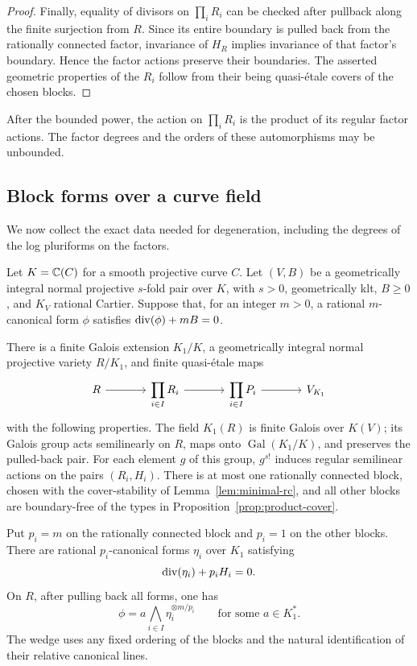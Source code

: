 \begin{proof}
Finally, equality of divisors on $\prod_iR_i$ can be checked after
pullback along the finite surjection from $R$.  Since its entire
boundary is pulled back from the rationally connected factor,
invariance of $H_R$ implies invariance of that factor's boundary.
Hence the factor actions preserve their boundaries.  The asserted
geometric properties of the $R_i$ follow
from their being quasi-\'etale covers of the chosen blocks.
\end{proof}

After the bounded power, the action on $\prod_iR_i$ is the product
of its regular factor actions.  The factor degrees and the orders
of these automorphisms may be unbounded.

\subsection{Block forms over a curve field}

We now collect the exact data needed for degeneration, including
the degrees of the log pluriforms on the factors.

\begin{corollary}\label{cor:block-forms}
Let $K=\mathbb C(C)$ for a smooth projective curve $C$.  Let $(V,B)$
be a geometrically integral normal projective $s$-fold pair over
$K$, with $s>0$, geometrically klt, $B\geq0$, and $K_V$
rational Cartier.  Suppose that, for an integer $m>0$, a rational $m$-canonical form
$\phi$ satisfies $\operatorname{div}(\phi)+mB=0$.

There is a finite Galois extension $K_1/K$, a geometrically integral
normal projective variety $R/K_1$, and finite quasi-\'etale maps
\[
\begin{tikzcd}[column sep=large]
 R \arrow[r] & \displaystyle\prod_{i\in I}R_i
 \arrow[r] & \displaystyle\prod_{i\in I}P_i
 \arrow[r] & V_{K_1}
\end{tikzcd}
\]
with the following properties.  The field $K_1(R)$ is finite Galois
over $K(V)$; its Galois group acts semilinearly on $R$, maps onto
$\operatorname{Gal}(K_1/K)$, and preserves the pulled-back pair.
For each element $g$ of this group, $g^{s!}$ induces regular
semilinear actions on the pairs $(R_i,H_i)$.  There is at most one
rationally connected block, chosen with the cover-stability of
Lemma~\ref{lem:minimal-rc}, and all other blocks are boundary-free
of the types in Proposition~\ref{prop:product-cover}.

Put $p_i=m$ on the rationally connected block and $p_i=1$ on the
other blocks.  There are rational $p_i$-canonical forms $\eta_i$
over $K_1$ satisfying
\begin{equation}\label{eq:block-trivializations}
                       \operatorname{div}(\eta_i)+p_iH_i=0.
\end{equation}
On $R$, after pulling back all forms, one has
\begin{equation}\label{eq:block-product-form}
                 \phi=a\bigwedge_{i\in I}\eta_i^{\otimes m/p_i}
                 \qquad\text{for some }a\in K_1^*.
\end{equation}
The wedge uses any fixed ordering of the blocks and the natural
identification of their relative canonical lines.
\end{corollary}

